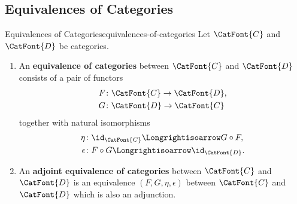 \subsection{Equivalences of Categories}\label{subsection-equivalences-of-categories}
\begin{definition}{Equivalences of Categories}{equivalences-of-categories}%
    Let $\CatFont{C}$ and $\CatFont{D}$ be categories.
    \begin{enumerate}
        \item\label{equivalences-of-categories-equivalence-of-categories}An \textbf{equivalence of categories} between $\CatFont{C}$ and $\CatFont{D}$ consists of a pair of functors
            \begin{align*}
                F &\colon \CatFont{C}\to\CatFont{D},\\
                G &\colon \CatFont{D}\to\CatFont{C}
            \end{align*}
            together with natural isomorphisms%
            \begin{align*}
                \eta     &\colon \id_{\CatFont{C}} \Longrightisoarrow G\circ F,\\%
                \epsilon &\colon F\circ G          \Longrightisoarrow \id_{\CatFont{D}}.
            \end{align*}
        \item\label{equivalences-of-categories-adjoint-equivalence-of-categories}An \textbf{adjoint equivalence of categories} between $\CatFont{C}$ and $\CatFont{D}$ is an equivalence $(F,G,\eta,\epsilon)$ between $\CatFont{C}$ and $\CatFont{D}$ which is also an adjunction.
    \end{enumerate}
\end{definition}
